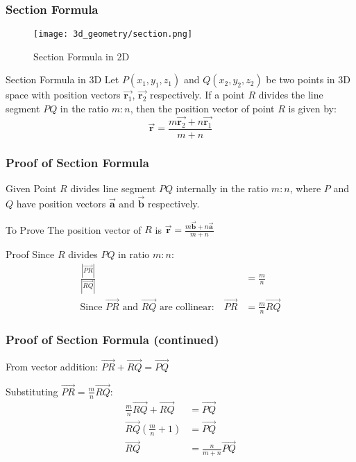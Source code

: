 \begin{frame}
    \frametitle{Section Formula}
    \begin{figure}
        \texttt{[image: 3d\_geometry/section.png]}
        \caption{Section Formula in 2D}
    \end{figure} 
\end{frame}


\begin{frame}
    \begin{block}{Section Formula in 3D}
    Let \(P(x_1, y_1, z_1)\) and \(Q(x_2, y_2, z_2)\) be two points in 3D space with position vectors \( \vec{\mathbf{r}_1} \), \( \vec{\mathbf{r}_2} \) respectively. If a point \(R\) divides the line segment \(PQ\) in the ratio \(m:n\), then the position vector of point \(R\) is given by:
    \[
    \vec{\mathbf{r}} = \frac{m\vec{\mathbf{r}_2} + n\vec{\mathbf{r}_1}}{m+n}
    \]
    \end{block}
\end{frame}

\begin{frame}
    \frametitle{Proof of Section Formula}
    \begin{block}{Given}
    Point \(R\) divides line segment \(PQ\) internally in the ratio \(m:n\), where \(P\) and \(Q\) have position vectors \(\vec{\mathbf{a}}\) and \(\vec{\mathbf{b}}\) respectively.
    \end{block}
    
    \begin{block}{To Prove}
    The position vector of \(R\) is \(\vec{\mathbf{r}} = \frac{m\vec{\mathbf{b}} + n\vec{\mathbf{a}}}{m+n}\)
    \end{block}
    
    \begin{block}{Proof}
    Since \(R\) divides \(PQ\) in ratio \(m:n\):
    \begin{align}
        \frac{|\vec{PR}|}{|\vec{RQ}|} &= \frac{m}{n} \\
        \text{Since } \vec{PR} \text{ and } \vec{RQ} \text{ are collinear:} \quad \vec{PR} &= \frac{m}{n}\vec{RQ}
    \end{align}
    \end{block}
\end{frame}

\begin{frame}
    \frametitle{Proof of Section Formula (continued)}
    
    From vector addition: \(\vec{PR} + \vec{RQ} = \vec{PQ}\)
    
    Substituting \(\vec{PR} = \frac{m}{n}\vec{RQ}\):
    \begin{align}
        \frac{m}{n}\vec{RQ} + \vec{RQ} &= \vec{PQ} \\
        \vec{RQ}\left(\frac{m}{n} + 1\right) &= \vec{PQ} \\
        \vec{RQ} &= \frac{n}{m+n}\vec{PQ}
    \end{align}

\end{frame}


